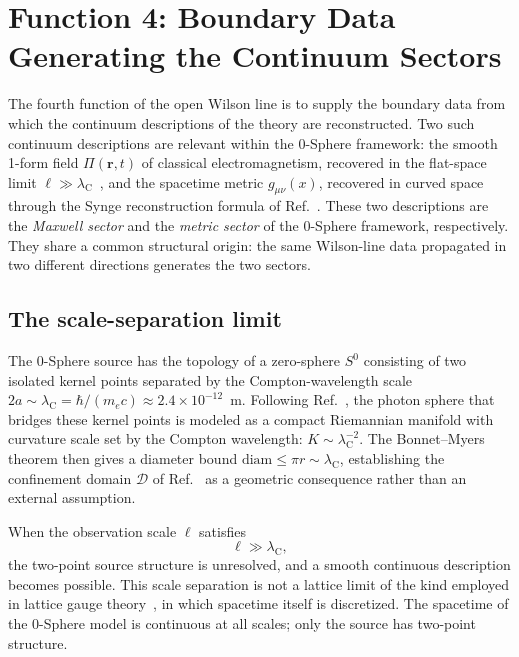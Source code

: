 \documentclass[%
 reprint, amsmath,amssymb, aps, prb, ]{revtex4-2}
\numberwithin{equation}{section}
\newcommand{\lambdaC}{\lambda_{\mathrm{C}}}
\begin{document}
\section{Function 4: Boundary Data Generating the Continuum Sectors}
\label{sec:boundary}

The fourth function of the open Wilson line is to supply the boundary data from which the continuum descriptions of the theory are reconstructed. Two such continuum descriptions are relevant within the 0-Sphere framework: the smooth 1-form field $\Pi(\mathbf{r},t)$ of classical electromagnetism, recovered in the flat-space limit $\ell \gg \lambdaC$~\cite{hanamura54}, and the spacetime metric $g_{\mu\nu}(x)$, recovered in curved space through the Synge reconstruction formula of Ref.~\cite{hanamura51}. These two descriptions are the \emph{Maxwell sector} and the \emph{metric sector} of the 0-Sphere framework, respectively. They share a common structural origin: the same Wilson-line data propagated in two different directions generates the two sectors.

\subsection{The scale-separation limit}

The 0-Sphere source has the topology of a zero-sphere $S^0$ consisting of two isolated kernel points separated by the Compton-wavelength scale $2a \sim \lambdaC = \hbar/(m_e c) \approx 2.4 \times 10^{-12}$~m. Following Ref.~\cite{hanamura51}, the photon sphere that bridges these kernel points is modeled as a compact Riemannian manifold with curvature scale set by the Compton wavelength: $K \sim \lambdaC^{-2}$. The Bonnet--Myers theorem then gives a diameter bound $\mathrm{diam} \leq \pi r \sim \lambdaC$, establishing the confinement domain $\mathcal{D}$ of Ref.~\cite{hanamura33} as a geometric consequence rather than an external assumption.

When the observation scale $\ell$ satisfies
\begin{equation}
\ell \gg \lambdaC,
\label{eq:scale_sep}
\end{equation}
the two-point source structure is unresolved, and a smooth continuous description becomes possible. This scale separation is not a lattice limit of the kind employed in lattice gauge theory~\cite{Wilson1974}, in which spacetime itself is discretized. The spacetime of the 0-Sphere model is continuous at all scales; only the source has two-point structure.
\end{document}
